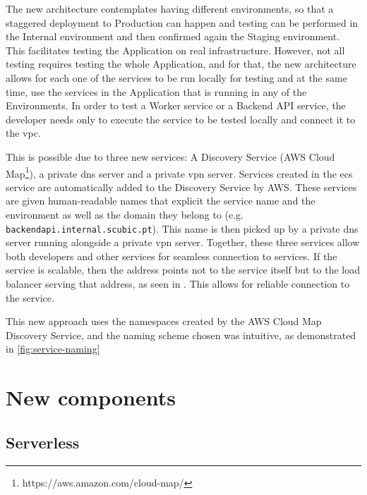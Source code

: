 The new architecture contemplates having different environments, so that a staggered deployment to Production can happen and testing can be performed in the Internal environment and then confirmed again the Staging environment. This facilitates testing the Application on real infrastructure. However, not all testing requires testing the whole Application, and for that, the new architecture allows for each one of the services to be run locally for testing and at the same time, use the services in the Application that is running in any of the Environments. In order to test a Worker service or a Backend API service, the developer needs only to execute the service to be tested locally and connect it to the \gls{vpc}.



This is possible due to three new services: A Discovery Service (AWS Cloud Map\footnote{https://aws.amazon.com/cloud-map/\label{foot:cloudmap}}), a private \gls{dns} server and a private \gls{vpn} server.
Services created in the \gls{ecs} service are automatically added to the Discovery Service by AWS. These services are given human-readable names that explicit the service name and the environment as well as the domain they belong to (e.g. \texttt{backendapi.internal.scubic.pt}). This name is then picked up by a private \gls{dns} server running alongside a private \gls{vpn} server. Together, these three services allow both developers and other services for seamless connection to services. If the service is scalable, then the address points not to the service itself but to the load balancer serving that address, as seen in . This allows for reliable connection to the service.

This new approach uses the namespaces created by the AWS Cloud Map Discovery Service, and the naming scheme chosen was intuitive, as demonstrated in \cref{fig:service-naming}



\section{New components}\label{methodology:ss:new-components-new-arch}

\subsection{Serverless}\label{methodology:sss:serverless}

